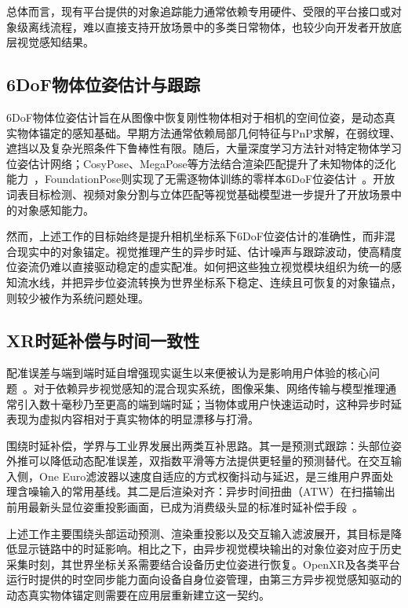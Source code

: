 \documentclass[review]{vgtc}
\begin{document}
总体而言，现有平台提供的对象追踪能力通常依赖专用硬件、受限的平台接口或对象级离线流程，难以直接支持开放场景中的多类日常物体，也较少向开发者开放底层视觉感知结果。

\subsection{6DoF物体位姿估计与跟踪}

6DoF物体位姿估计旨在从图像中恢复刚性物体相对于相机的空间位姿，是动态真实物体锚定的感知基础。早期方法通常依赖局部几何特征与PnP求解，在弱纹理、遮挡以及复杂光照条件下鲁棒性有限。随后，大量深度学习方法针对特定物体学习位姿估计网络；CosyPose、MegaPose等方法结合渲染匹配提升了未知物体的泛化能力~\cite{cosypose2020,megapose2022}，FoundationPose则实现了无需逐物体训练的零样本6DoF位姿估计~\cite{foundationpose2023}。开放词表目标检测、视频对象分割与立体匹配等视觉基础模型进一步提升了开放场景中的对象感知能力。

然而，上述工作的目标始终是提升相机坐标系下6DoF位姿估计的准确性，而非混合现实中的对象锚定。视觉推理产生的异步时延、估计噪声与跟踪波动，使高精度位姿流仍难以直接驱动稳定的虚实配准。如何把这些独立视觉模块组织为统一的感知流水线，并把异步位姿流转换为世界坐标系下稳定、连续且可恢复的对象锚点，则较少被作为系统问题处理。

\subsection{XR时延补偿与时间一致性}

配准误差与端到端时延自增强现实诞生以来便被认为是影响用户体验的核心问题~\cite{azuma1994improving,diluca2010latency}。对于依赖异步视觉感知的混合现实系统，图像采集、网络传输与模型推理通常引入数十毫秒乃至更高的端到端时延；当物体或用户快速运动时，这种异步时延表现为虚拟内容相对于真实物体的明显漂移与打滑。

围绕时延补偿，学界与工业界发展出两类互补思路。其一是预测式跟踪：头部位姿外推可以降低动态配准误差，双指数平滑等方法提供更轻量的预测替代。在交互输入侧，One Euro滤波器以速度自适应的方式权衡抖动与延迟，是三维用户界面处理含噪输入的常用基线。其二是后渲染对齐：异步时间扭曲（ATW）在扫描输出前用最新头显位姿重投影画面，已成为消费级头显的标准时延补偿手段~\cite{vanwaveren2016atw}。

上述工作主要围绕头部运动预测、渲染重投影以及交互输入滤波展开，其目标是降低显示链路中的时延影响。相比之下，由异步视觉模块输出的对象位姿对应于历史采集时刻，其世界坐标关系需要结合设备历史位姿进行恢复。OpenXR及各类平台运行时提供的时空同步能力面向设备自身位姿管理，由第三方异步视觉感知驱动的动态真实物体锚定则需要在应用层重新建立这一契约。
\end{document}
